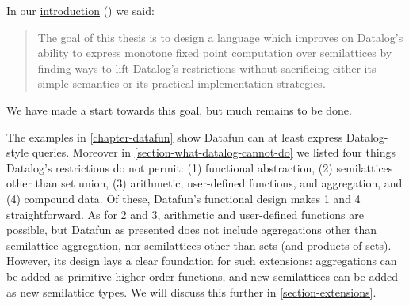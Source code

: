 \vspace{1em}

\noindent
In our \hyperref[goal-of-thesis]{introduction}
() we said:

\begin{quote}
  The goal of this thesis is to design a language which improves on Datalog's
  ability to express monotone fixed point computation over semilattices by
  finding ways to lift Datalog's restrictions without sacrificing either its
  simple semantics or its practical implementation strategies.
\end{quote}

\noindent
We have made a start towards this goal, but much remains to be done.

The examples in \cref{chapter-datafun} show Datafun can at least express
Datalog-style queries. Moreover in \cref{section-what-datalog-cannot-do} we
listed four things Datalog's restrictions do not permit: (1) functional
abstraction, (2) semilattices other than set union, (3) arithmetic, user-defined
functions, and aggregation, and (4) compound data.
%
Of these, Datafun's functional design makes 1 and 4 straightforward.
%
As for 2 and 3, arithmetic and user-defined functions are possible, but Datafun as
presented does not include aggregations other than semilattice aggregation, nor
semilattices other than sets (and products of sets).
%
However, its design lays a clear foundation for such extensions: aggregations can be added as primitive higher-order functions, and new semilattices can be added as new semilattice types. We will discuss this further in \cref{section-extensions}.

